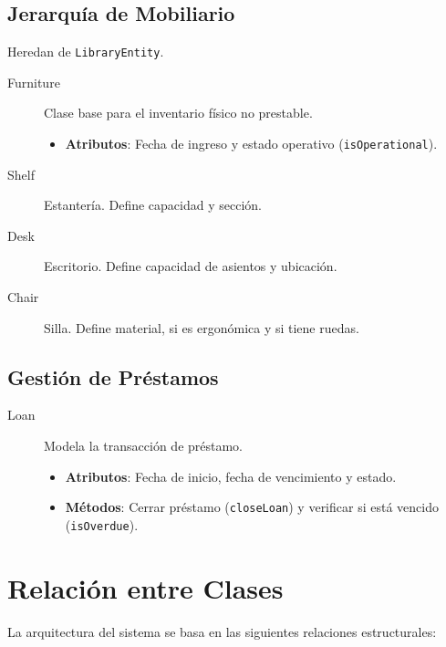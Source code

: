 \documentclass[stu, 12pt, letterpaper, donotrepeattitle]{apa7}
\begin{document}
    \subsection{Jerarquía de Mobiliario}
    Heredan de \texttt{LibraryEntity}.
    \begin{description}
        \item[Furniture] Clase base para el inventario físico no prestable.
        \begin{itemize}
            \item \textbf{Atributos}: Fecha de ingreso y estado operativo (\texttt{isOperational}).
        \end{itemize}
        \item[Shelf] Estantería. Define capacidad y sección.
        \item[Desk] Escritorio. Define capacidad de asientos y ubicación.
        \item[Chair] Silla. Define material, si es ergonómica y si tiene ruedas.
    \end{description}

    \subsection{Gestión de Préstamos}
    \begin{description}
        \item[Loan] Modela la transacción de préstamo.
        \begin{itemize}
            \item \textbf{Atributos}: Fecha de inicio, fecha de vencimiento y estado.
            \item \textbf{Métodos}: Cerrar préstamo (\texttt{closeLoan}) y verificar si está vencido (\texttt{isOverdue}).
        \end{itemize}
    \end{description}

    \section{Relación entre Clases}

    La arquitectura del sistema se basa en las siguientes relaciones estructurales:
\end{document}
